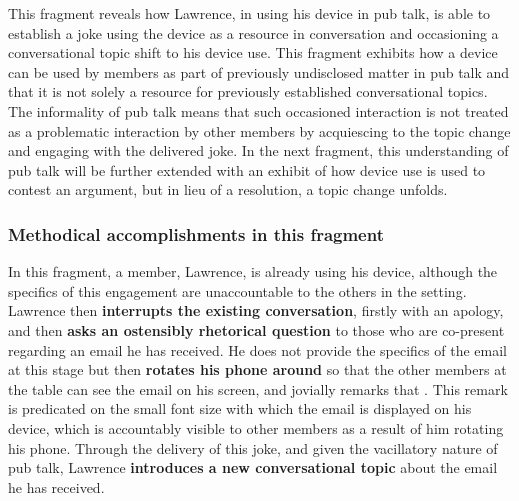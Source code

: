 \begin{revisedsubmission}
This fragment reveals how Lawrence, in using his device in pub talk, is able to establish a joke using the device as a resource in conversation and occasioning a conversational topic shift to his device use.
This fragment exhibits how a device can be used by members as part of previously undisclosed matter in pub talk and that it is not solely a resource for previously established conversational topics.
The informality of pub talk means that such occasioned interaction is not treated as a problematic interaction by other members by acquiescing to the topic change and engaging with the delivered joke.
In the next fragment, this understanding of pub talk will be further extended with an exhibit of how device use is used to contest an argument, but in lieu of a resolution, a topic change unfolds.
\end{revisedsubmission}






\subsubsection{Methodical accomplishments in this fragment}\label{sec:empirical pub findings joke methods}
\begin{revisedsubmission}
In this fragment, a member, Lawrence, is already using his device, although the specifics of this engagement are unaccountable to the others in the setting.
Lawrence then \textbf{interrupts the existing conversation}, firstly with an apology, and then \textbf{asks an ostensibly rhetorical question} to those who are co-present regarding an email he has received.
He does not provide the specifics of the email at this stage but then \textbf{rotates his phone around} so that the other members at the table can see the email on his screen, and jovially remarks that .
This remark is predicated on the small font size with which the email is displayed on his device, which is accountably visible to other members as a result of him rotating his phone.
Through the delivery of this joke, and given the vacillatory nature of pub talk, Lawrence \textbf{introduces a new conversational topic} about the email he has received.
\end{revisedsubmission}






